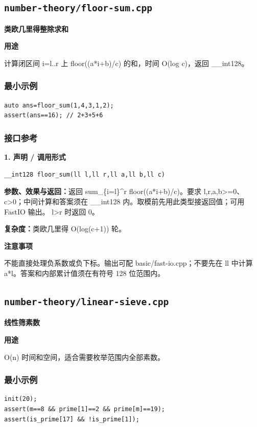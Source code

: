 \documentclass[UTF8,a4paper,10pt]{ctexart}
\newcommand{\TemplUsage}[1]{\textbf{用途}\par #1\par}
\newcommand{\TemplNote}[1]{\textbf{注意事项}\par #1\par}
\begin{document}
\subsection{\texttt{number-theory/floor-sum.cpp}}
\textbf{类欧几里得整除求和}\par
\TemplUsage{计算闭区间 i=l..r 上 floor((a*i+b)/c) 的和，时间 O(log c)，返回 \_\_int128。}
\subsubsection*{最小示例}
\begin{lstlisting}
auto ans=floor_sum(1,4,3,1,2);
assert(ans==16); // 2+3+5+6
\end{lstlisting}
\subsubsection*{接口参考}
\noindent\begin{minipage}{\textwidth}
\textbf{1. 声明 / 调用形式}
\begin{lstlisting}
__int128 floor_sum(ll l,ll r,ll a,ll b,ll c)
\end{lstlisting}
\textbf{参数、效果与返回：}返回 sum\_\{i=l\}\textasciicircum{}r floor((a*i+b)/c)。要求 l,r,a,b>=0、c>0；中间计算和答案须在 \_\_int128 内。取模前先用此类型接返回值；可用 FastIO 输出。 l>r 时返回 0。

\textbf{复杂度：}类欧几里得 O(log(c+1)) 轮。

\TemplNote{不能直接处理负系数或负下标。输出可配 basic/fast-io.cpp；不要先在 ll 中计算 a*l。答案和内部累计值须在有符号 128 位范围内。}
\end{minipage}\par\vspace{0.4em}
\clearpage
\subsection{\texttt{number-theory/linear-sieve.cpp}}
\textbf{线性筛素数}\par
\TemplUsage{O(n) 时间和空间，适合需要枚举范围内全部素数。}
\subsubsection*{最小示例}
\begin{lstlisting}
init(20);
assert(m==8 && prime[1]==2 && prime[m]==19);
assert(is_prime[17] && !is_prime[1]);
\end{lstlisting}
\end{document}
